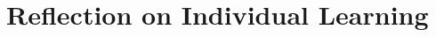 \documentclass[12pt]{report}
\begin{document}
\section{Reflection on Individual Learning}


\printbibliography
\end{document}
